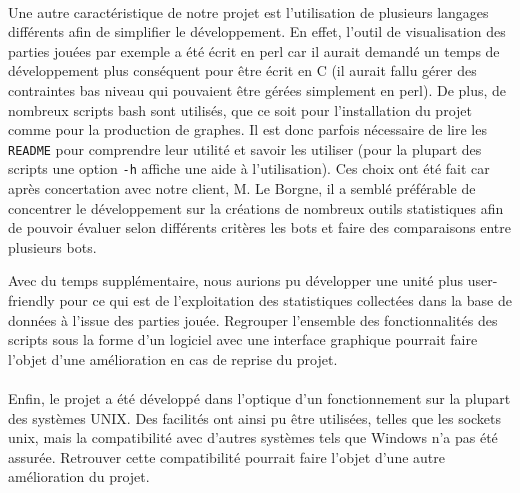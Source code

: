 \documentclass[a4paper,12pt]{article}
\begin{document}
\paragraph{}
Une autre caractéristique de notre projet est l'utilisation de plusieurs
langages différents afin de simplifier le développement.
En effet, l'outil de visualisation des parties jouées par exemple a été écrit
en perl car il aurait demandé un temps de développement plus conséquent pour
être écrit en C (il aurait fallu gérer des contraintes bas niveau qui
pouvaient être gérées simplement en perl). De plus, de nombreux scripts bash
sont utilisés, que ce soit pour l'installation du projet comme pour la
production de graphes. Il est donc parfois nécessaire de lire les \verb!README!
pour comprendre leur utilité et savoir les utiliser (pour la plupart des
scripts une option \verb!-h! affiche une aide à l'utilisation). Ces choix ont
été fait car après concertation avec notre client, M. Le Borgne, il a
semblé préférable de concentrer le développement sur la créations de nombreux
outils statistiques afin de pouvoir évaluer selon différents critères les bots
et faire des comparaisons entre plusieurs bots.

Avec du temps supplémentaire, nous aurions pu développer une unité plus
user-friendly pour ce qui est de l'exploitation des statistiques collectées
dans la base de données à l'issue des parties jouée. Regrouper l'ensemble des
fonctionnalités des scripts sous la forme d'un logiciel avec une interface
graphique pourrait faire l'objet d'une amélioration en cas de reprise du
projet.

\paragraph{}
Enfin, le projet a été développé dans l'optique d'un fonctionnement sur la
plupart des systèmes UNIX. Des facilités ont ainsi pu être utilisées, telles
que les sockets unix, mais la compatibilité avec d'autres systèmes tels que
Windows n'a pas été assurée. Retrouver cette compatibilité pourrait faire
l'objet d'une autre amélioration du projet.
\end{document}
